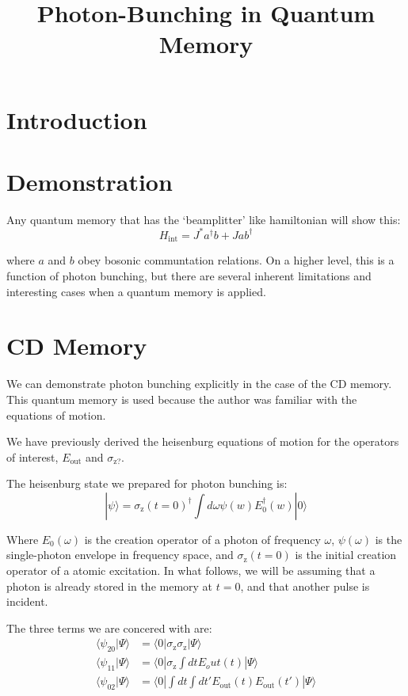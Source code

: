 \documentclass[12pt]{article}
\title{Photon-Bunching in Quantum Memory}
\begin{document}

\maketitle
\section{Introduction}

\section{Demonstration}

Any quantum memory that has the `beamplitter' like hamiltonian will show this:
\begin{equation}
H_{\textrm{int}}= J^* a^\dagger b + J a b^\dagger
\end{equation}

where $a$ and $b$ obey bosonic communtation relations. On a higher level, this is a function of photon bunching, but there are several inherent limitations and interesting cases when a quantum memory is applied.

\section{CD Memory}
We can demonstrate photon bunching explicitly in the case of the CD memory\cite{arxiv}. This quantum memory is used because the author was familiar with the equations of motion.

We have previously derived the heisenburg equations of motion for the operators of interest, $E_{\textrm{out}}$ and $\sigma_{\textrm{z?}}$.

The heisenburg state we prepared for photon bunching is:
\begin{equation}
| \psi \rangle = \sigma_\textrm{z}(t=0)^\dagger \int d\omega \psi(w) E_0^\dagger(w) | 0 \rangle
\end{equation}

Where $E_0(\omega)$ is the creation operator of a photon of frequency $\omega$, $\psi(\omega)$ is the single-photon envelope in frequency space, and $\sigma_\textrm{z}(t=0)$ is the initial creation operator of a atomic excitation. In what follows, we will be assuming that a photon is already stored in the memory at $t=0$, and that another pulse is incident.

The three terms we are concered with are:
\begin{align}
\langle \psi_{20}| \Psi \rangle &=\langle 0 | \sigma_\textrm{z} \sigma_\textrm{z} | \Psi \rangle\\
\langle \psi_{11} | \Psi \rangle& =\langle 0 | \sigma_\textrm{z} \int dt E_out(t) | \Psi \rangle\\
\langle \psi_{02} | \Psi \rangle &= \langle 0 | \int dt \int dt' E_\textrm{out}(t) E_\textrm{out}(t') | \Psi \rangle
\end{align}
\end{document}
